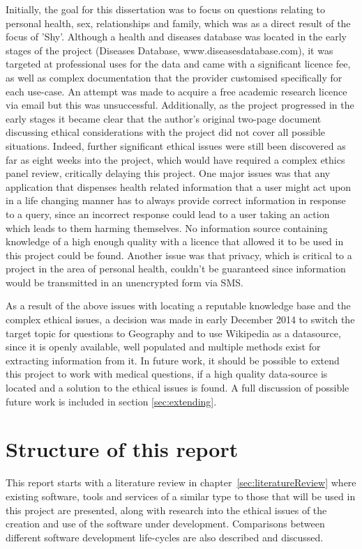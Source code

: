 \documentclass[authoryearcitations]{UoYCSproject}
\begin{document}
Initially, the goal for this dissertation was to focus on questions relating to personal health, sex, relationships and family, which was as a direct result of the focus of 'Shy'.  Although a health and diseases database was located in the early stages of the project (Diseases Database, www.diseasesdatabase.com), it was targeted at professional uses for the data and came with a significant licence fee, as well as complex documentation that the provider customised specifically for each use-case.  An attempt was made to acquire a free academic research licence via email but this was unsuccessful.  Additionally, as the project progressed in the early stages it became clear that the author's original two-page document discussing ethical considerations with the project did not cover all possible situations.  Indeed, further significant ethical issues were still been discovered as far as eight weeks into the project, which would have required a complex ethics panel review, critically delaying this project.  One major issues was that any application that dispenses health related information that a user might act upon in a life changing manner has to always provide correct information in response to a query, since an incorrect response could lead to a user taking an action which leads to them harming themselves. No information source containing knowledge of a high enough quality with a licence that allowed it to be used in this project could be found. Another issue was that privacy, which is critical to a project in the area of personal health, couldn't be guaranteed since information would be transmitted in an unencrypted form via SMS.

As a result of the above issues with locating a reputable knowledge base and the complex ethical issues, a decision was made in early December 2014 to switch the target topic for questions to Geography and to use Wikipedia as a datasource, since it is openly available, well populated and multiple methods exist for extracting information from it.  In future work, it should be possible to extend this project to work with medical questions, if a high quality data-source is located and a solution to the ethical issues is found. A full discussion of possible future work is included in section \ref{sec:extending}.

\section{Structure of this report}
This report starts with a literature review in chapter~\ref{sec:literatureReview} where existing software, tools and services of a similar type to those that will be used in this project are presented, along with research into the ethical issues of the creation and use of the software under development. Comparisons between different software development life-cycles are also described and discussed.
\end{document}
